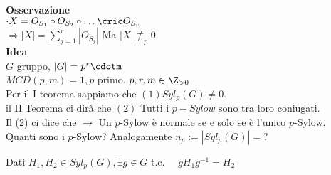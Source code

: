 \documentclass[12px]{article}
\begin{document}
	  \textbf{Osservazione}\\
	  $\cdot X = O_{S_1}\circ O_{S_2}\circ\ldots\cric O_{S_r}$\\
	  $ \Rightarrow |X| = \sum^r_{j=1} |O_{S_j}|$ Ma $|X|\not\equiv_p 0$\\
	  \textbf{Idea}\\
	  $G$ gruppo, $|G| = p^r \cdotm$\\
	  $MCD(p,m) = 1, p$ primo, $p,r,m\in\Z_{>0}$ \\
	  Per il I teorema sappiamo che $(1) Syl_p(G)\neq 0$.\\
	  il  II Teorema ci dirà che $(2)$ Tutti i $p-Sylow$ sono tra loro coniugati.\\
	  Il (2) ci dice che $ \rightarrow$ Un $p$-Sylow è normale se e solo se è l'unico $p$-Sylow.\\
	  Quanti sono i $p$-Sylow? Analogamente $n_p := |Syl_p(G)| = ?$\\
	  \begin{teo}
		  Dati $H_1, H_2\in Syl_p (G), \exists g\in G$ t.c. \ \ $g H_1 g^{-1} = H_2$\\
	  \end{teo}
\end{document}
